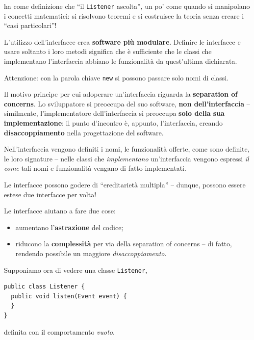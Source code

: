 \documentclass[\fontsizeclass,twocolumn]{\classname}
\theoremstyle{definition}
\theoremstyle{definition}
\begin{document}
ha come definizione che ``il \texttt{Listener} ascolta'', un po' come quando si
manipolano i concetti matematici: si risolvono teoremi e si costruisce la
teoria senza creare i ``casi particolari''!

L'utilizzo dell'interfacce crea \textbf{software più modulare}. Definire le
interfacce e usare soltanto i loro metodi significa che è sufficiente che le
classi che implementano l'interfaccia abbiano le funzionalità da quest'ultima
dichiarata.

Attenzione: con la parola chiave \texttt{new} si possono passare solo nomi di
classi.

Il motivo principe per cui adoperare un'interfaccia riguarda la
\textbf{separation of concerns}. Lo sviluppatore si preoccupa del suo software,
\textbf{non dell'interfaccia} -- similmente, l'implementatore dell'interfaccia
si preoccupa \textbf{solo della sua implementazione}: il punto d'incontro è,
appunto, l'interfaccia, creando \textbf{disaccoppiamento} nella progettazione
del software.

Nell'interfaccia vengono definiti i nomi, le funzionalità offerte, come sono
definite, le loro signature -- nelle classi che \emph{implementano}
un'interfaccia vengono espressi \emph{il come} tali nomi e funzionalità vengano di
fatto implementati.

Le interfacce possono godere di ``ereditarietà multipla'' -- dunque, possono
essere estese due interfacce per volta!

Le interfacce aiutano a fare due cose:
\begin{itemize}
    \item aumentano l'\textbf{astrazione} del codice;
    \item riducono la \textbf{complessità} per via della separation of concerns
        -- di fatto, rendendo possibile un maggiore \emph{disaccoppiamento}.
\end{itemize}

Supponiamo ora di vedere una classe \texttt{Listener},

\begin{lstlisting}
public class Listener {
  public void listen(Event event) {
  }
}
\end{lstlisting}

definita con il comportamento \emph{vuoto}.
\end{document}
